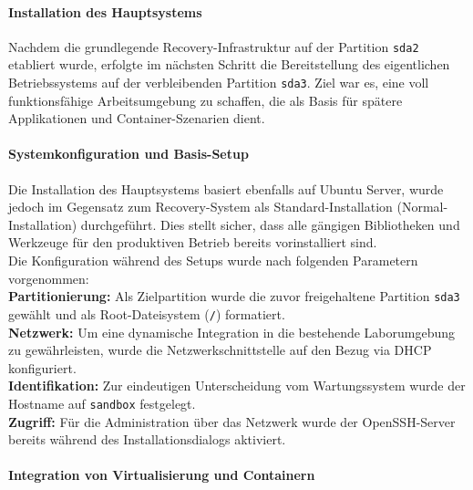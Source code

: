 \documentclass[11pt,
a4paper,
numbers=nonperiod,
footsepline,
oneside,
numbers=noenddot,
bibliography=totoc
]{scrartcl}
\begin{document}
\paragraph{Installation des Hauptsystems}

Nachdem die grundlegende Recovery-Infrastruktur auf der Partition \texttt{sda2} etabliert wurde, erfolgte im nächsten Schritt die Bereitstellung des eigentlichen Betriebssystems auf der verbleibenden Partition \texttt{sda3}. Ziel war es, eine voll funktionsfähige Arbeitsumgebung zu schaffen, die als Basis für spätere Applikationen und Container-Szenarien dient.\\

\paragraph{Systemkonfiguration und Basis-Setup}

Die Installation des Hauptsystems basiert ebenfalls auf Ubuntu Server, wurde jedoch im Gegensatz zum Recovery-System als Standard-Installation (Normal-Installation) durchgeführt. Dies stellt sicher, dass alle gängigen Bibliotheken und Werkzeuge für den produktiven Betrieb bereits vorinstalliert sind.\\

Die Konfiguration während des Setups wurde nach folgenden Parametern vorgenommen:\\

\textbf{Partitionierung:} Als Zielpartition wurde die zuvor freigehaltene Partition \texttt{sda3} gewählt und als Root-Dateisystem (\texttt{/}) formatiert.\\

\textbf{Netzwerk:} Um eine dynamische Integration in die bestehende Laborumgebung zu gewährleisten, wurde die Netzwerkschnittstelle auf den Bezug via DHCP konfiguriert.\\

\textbf{Identifikation:} Zur eindeutigen Unterscheidung vom Wartungssystem wurde der Hostname auf \texttt{sandbox} festgelegt.\\

\textbf{Zugriff:} Für die Administration über das Netzwerk wurde der OpenSSH-Server bereits während des Installationsdialogs aktiviert.\\

\paragraph{Integration von Virtualisierung und Containern}
\end{document}

